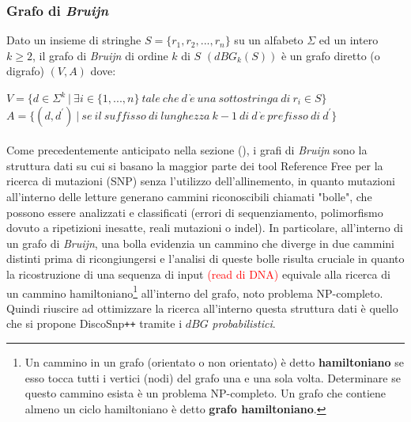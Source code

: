 \documentclass[../main.tex]{subfiles}
\begin{document}
\subsubsection{Grafo di \textit{Bruijn}}
\label{dBG}
\theoremstyle{definition}
\begin{definition} 

Dato un insieme di stringhe $S = \{r_1 , r_2 , ... , r_n\}$ su un alfabeto $\Sigma$ ed un intero $k\geq2$, il grafo di \textit{Bruijn} di ordine $k$ di $S$ $(dBG_k (S))$ è un grafo diretto (o digrafo) $(V,A)$ dove:

\begin{flushleft}
$V = \{d \in \Sigma^k \ |\  \exists i \in \{1, ..., n\} \ tale\ che\ d\ \grave{e}\ una\ sottostringa\ di\ r_i \in S\}$
\linebreak \linebreak
$A = \{ (d,d^\prime)\ |\ se\ il\ suffisso\ di\ lunghezza\ k-1\ di\ d\ \grave{e}\ prefisso\ di\ d^\prime\}$
\end{flushleft}

\end{definition}

\paragraph{}Come precedentemente anticipato nella sezione (), i grafi di \textit{Bruijn} sono la struttura dati su cui si basano la maggior parte dei tool Reference Free per la  ricerca di mutazioni (SNP) senza l'utilizzo dell'allinemento, in quanto mutazioni all'interno delle letture generano cammini riconoscibili chiamati "bolle", che possono essere analizzati e classificati (errori di sequenziamento, polimorfismo dovuto a ripetizioni inesatte, reali mutazioni o indel). In particolare, all'interno di un grafo di \textit{Bruijn}, una bolla evidenzia un cammino che diverge in due cammini distinti prima di ricongiungersi e l'analisi di queste bolle risulta cruciale in quanto la ricostruzione di una sequenza di input \textcolor{red}{(read di DNA)} equivale alla ricerca di un cammino hamiltoniano\footnote{Un cammino in un grafo (orientato o non orientato) è detto \textbf{hamiltoniano} se esso tocca tutti i vertici (nodi) del grafo una e una sola volta. Determinare se questo cammino esista è un problema NP-completo. Un grafo che contiene almeno un ciclo hamiltoniano è detto \textbf{grafo hamiltoniano}.} all'interno del grafo, noto problema NP-completo. Quindi riuscire ad ottimizzare la ricerca all'interno questa struttura dati è quello che si propone DiscoSnp\texttt{++} tramite i $dBG$ \textit{probabilistici}.
\end{document}
